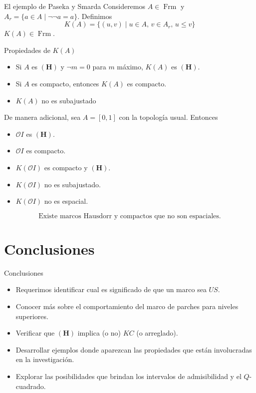 \documentclass[compress,12pt]{beamer}
\DeclareMathOperator{\Frm}{Frm}
\begin{document}
\begin{frame}{El ejemplo de Paseka y Smarda}
Consideremos $A\in\Frm$ y $A_r=\{a\in A\mid \neg\neg a=a\}$. Definimos
\[
K(A)=\{(u,v)\mid u\in A,\, v\in A_r,\, u\leq v\}
\]
$K(A)\in \Frm$.
\begin{block}{Propiedades de $K(A)$}
\begin{itemize}
	\item Si $A$ es $\mathbf{(H)}$ y $\neg m=0$ para $m$ máximo, $K(A)$ es $\mathbf{(H)}$.
	\item Si $A$ es compacto, entonces $K(A)$ es compacto.
	\item $K(A)$ no es subajustado
\end{itemize}
\end{block}
\end{frame}

\begin{frame}
De manera adicional, sea $A=[0,1]$ con la topología usual. Entonces
\begin{itemize}
\item $\mathcal{O}I$ es $\mathbf{(H)}$.
\item $\mathcal{O}I$ es compacto.
\item $K(\mathcal{O}I)$ es compacto y $\mathbf{(H)}$.
\item $K(\mathcal{O}I)$ no es subajustado.
\item $K(\mathcal{O}I)$ no es espacial.
\end{itemize}

\[
\mbox{Existe marcos Hausdorr y compactos que no son espaciales}.
\]
\end{frame}

\section{Conclusiones}
\begin{frame}{Conclusiones}
\begin{itemize}
\item Requerimos identificar cual es significado de que un marco sea $US$.
\item<2-> Conocer más sobre el comportamiento del marco de parches para niveles superiores.
\item<3-> Verificar que $\mathbf{(H)}$ implica (o no) $KC$ (o arreglado).
\item<4-> Desarrollar ejemplos donde aparezcan las propiedades que están involucradas en la investigación.
\item<5-> Explorar las posibilidades que brindan los intervalos de admisibilidad y el $Q$-cuadrado.
\end{itemize}
\end{frame}
\end{document}
